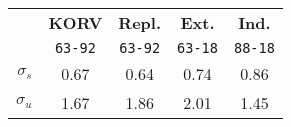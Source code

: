 \begin{tabular}{rcccc}
  \hline\hline
   & \textbf{KORV} & \textbf{Repl.} & \textbf{Ext.} & \textbf{Ind.} \\
   & \texttt{63-92} & \texttt{63-92} & \texttt{63-18} & \texttt{88-18} \\\hline
  $\sigma_s$ & 0.67 & 0.64 & 0.74 & 0.86 \\
  $\sigma_u$ & 1.67 & 1.86 & 2.01 & 1.45 \\\hline\hline
\end{tabular}
